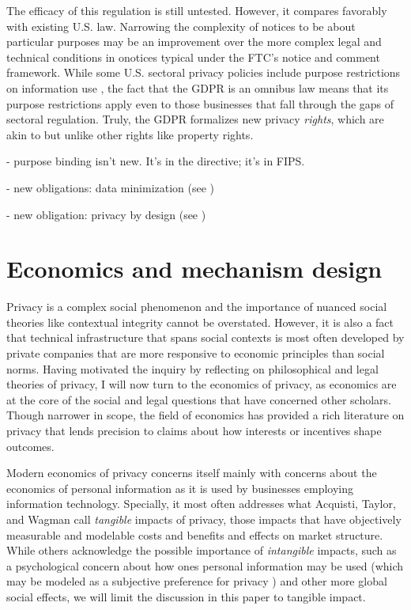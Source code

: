\documentclass[../thesis.tex]{subfiles}
\begin{document}
The efficacy of this regulation is still untested.
However, it compares favorably with existing U.S. law.
Narrowing the complexity of notices to be about particular
purposes may be an improvement over the
more complex legal and technical conditions in onotices
typical under the FTC's notice and comment framework.
While some U.S. sectoral privacy policies include
purpose restrictions on information use
\cite{tschantz2012formalizing}, the fact that
the GDPR is an omnibus law means that its purpose
restrictions apply even to those businesses that
fall through the gaps of sectoral regulation.
Truly, the GDPR formalizes new privacy \emph{rights},
which are akin to but unlike other rights like
property rights.


- purpose binding isn't new. It's in the directive; it's in FIPS.

- new obligations: data minimization (see \cite{gurses2011engineering})

- new obligation: privacy by design (see \cite{danezis2015privacy})

\section{Economics and mechanism design}
\label{sec:economics}

Privacy is a complex social phenomenon and the
importance of nuanced social theories like
contextual integrity cannot be overstated.
However, it is also a fact that technical
infrastructure that spans social contexts
is most often developed by private companies that are more
responsive to economic principles than social norms.
Having motivated the inquiry by reflecting on
philosophical and legal theories of privacy,
I will now turn to the economics of privacy,
as economics are at the core of the social and
legal questions that have concerned other scholars.
Though narrower in scope, the field of economics
has provided a rich
literature on privacy that lends precision to
claims about how interests
or incentives shape outcomes.

Modern economics of privacy concerns itself mainly with
concerns about the economics of personal information
as it is used by businesses employing
information technology.
Specially, it most often addresses what Acquisti,
 Taylor, and Wagman \cite{acquisti2016economics} 
call \emph{tangible} impacts of privacy, those impacts that
have objectively measurable and modelable costs and
benefits and effects on market structure.
While others acknowledge the possible importance
of \emph{intangible} impacts, such as a psychological
concern about how ones personal information may be
used (which may be modeled as a subjective preference
for privacy \cite{calo2011boundaries} 
\cite{cofone2017dynamic}) and other more global
social effects, we will limit the discussion in this
paper to tangible impact.
\end{document}
